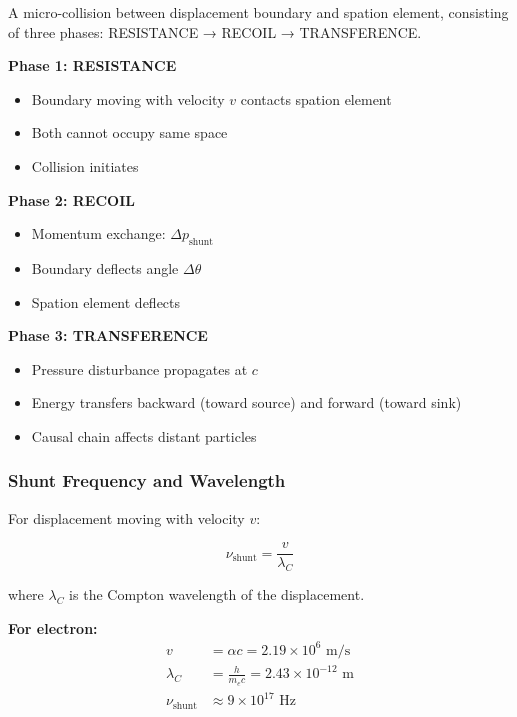 \begin{definition}[Shunt]
A micro-collision between displacement boundary and spation element, consisting of three phases: RESISTANCE → RECOIL → TRANSFERENCE.
\end{definition}

\textbf{Phase 1: RESISTANCE}
\begin{itemize}
\item Boundary moving with velocity $v$ contacts spation element
\item Both cannot occupy same space
\item Collision initiates
\end{itemize}

\textbf{Phase 2: RECOIL}
\begin{itemize}
\item Momentum exchange: $\Delta p_{\text{shunt}}$
\item Boundary deflects angle $\Delta \theta$
\item Spation element deflects
\end{itemize}

\textbf{Phase 3: TRANSFERENCE}
\begin{itemize}
\item Pressure disturbance propagates at $c$
\item Energy transfers backward (toward source) and forward (toward sink)
\item Causal chain affects distant particles
\end{itemize}

\subsubsection{Shunt Frequency and Wavelength}

For displacement moving with velocity $v$:

\begin{equation}
\nu_{\text{shunt}} = \frac{v}{\lambda_C}
\label{eq:shunt_frequency}
\end{equation}

where $\lambda_C$ is the Compton wavelength of the displacement.

\textbf{For electron:}
\begin{align}
v &= \alpha c = 2.19 \times 10^6 \text{ m/s} \\
\lambda_C &= \frac{h}{m_e c} = 2.43 \times 10^{-12} \text{ m} \\
\nu_{\text{shunt}} &\approx 9 \times 10^{17} \text{ Hz}
\end{align}


